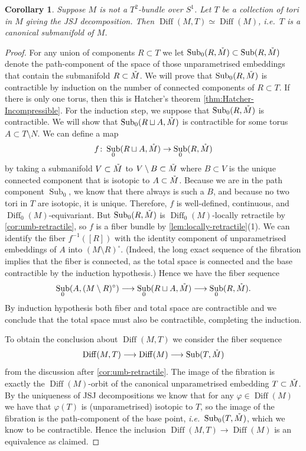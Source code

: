 \documentclass{amsart}
\theoremstyle{plain}
\newtheorem{cor}[thm]{Corollary}
\theoremstyle{definition}
\DeclareMathOperator\Diff{Diff}
\DeclareMathOperator{\umb}{Sub} %
\newcommand{\interior}[1]{\smash{\mathring{#1}}}
\begin{document}
\begin{cor}\label{cor:JSJ-canonical}
    Suppose $M$ is not a $T^2$-bundle over $S^1$. 
    Let $T$ be a collection of tori in $M$ giving the JSJ decomposition.
    Then $\Diff(M,T)\simeq \Diff(M)$, i.e.~$T$ is a canonical submanifold of $M$.
\end{cor}
\begin{proof}
    For any union of components $R \subset T$ we let $\umb_0(R, \interior{M}) \subset \umb(R, \interior{M})$ denote the path-component of the space of those unparametrised embeddings that contain the submanifold $R \subset \interior{M}$.
    We will prove that $\umb_0(R, \interior{M})$ is contractible by induction on the number of connected components of $R \subset T$.
    If there is only one torus, then this is Hatcher's theorem \ref{thm:Hatcher-Incompressible}.
    For the induction step, we suppose that $\umb_0(R, \interior{M})$ is contractible. We will show that $\umb_0(R \sqcup A, \interior{M})$ is contractible for some torus $A \subset T \setminus N$.
    We can define a map
    \[  
        f\colon \umb_0(R \sqcup A, \interior{M}) \to \umb_0(R, \interior{M})
    \]
    by taking a submanifold $V \subset \interior{M}$ to $V \setminus B \subset \interior{M}$ where $B \subset V$ is the unique connected component that is isotopic to $A \subset \interior{M}$.
    Because we are in the path component $\umb_0$, we know that there always is such a $B$, and because no two tori in $T$ are isotopic, it is unique.
    Therefore, $f$ is well-defined, continuous, and $\Diff_0(M)$-equivariant.
    But $\umb_0(R, \interior{M})$ is $\Diff_0(M)$-locally retractile by \cref{cor:umb-retractile}, so $f$ is a fiber bundle by \cref{lem:locally-retractile}(1).
    We can identify the fiber $f^{-1}([R])$ with the identity component of unparametrised embeddings of $A$ into $(M\setminus R)^\circ$.
    (Indeed, the long exact sequence of the fibration implies that the fiber is connected, as the total space is connected and the base contractible by the induction hypothesis.)
    Hence we have the fiber sequence
    \[
        \umb_0(A, (M \setminus R)^\circ) \longrightarrow 
        \umb_0(R \sqcup A, \interior{M}) \longrightarrow
        \umb_0(R, \interior{M}).
    \]
    By induction hypothesis both fiber and total space are contractible and we conclude that the total space must also be contractible, completing the induction.

    To obtain the conclusion about $\Diff(M, T)$ we consider the fiber sequence
    \[
        \Diff(M, T) \longrightarrow \Diff(M) \longrightarrow \umb(T, \interior{M})
    \]
    from the discussion after \cref{cor:umb-retractile}.
    The image of the fibration is exactly the $\Diff(M)$-orbit of the canonical unparametrised embedding $T \subset \interior{M}$.
    By the uniqueness of JSJ decompositions we know that for any $\varphi \in \Diff(M)$ we have that $\varphi(T)$ is (unparametrised) isotopic to $T$,
    so the image of the fibration is the path-component of the base point, \emph{i.e.}~$\umb_0(T, \interior{M})$, which we know to be contractible.
    Hence the inclusion $\Diff(M, T) \to \Diff(M)$ is an equivalence as claimed.
\end{proof}
\end{document}
